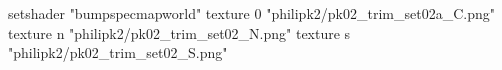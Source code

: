 setshader "bumpspecmapworld"
    texture 0 "philipk2/pk02_trim_set02a_C.png"
    texture n "philipk2/pk02_trim_set02_N.png"
    texture s "philipk2/pk02_trim_set02_S.png"